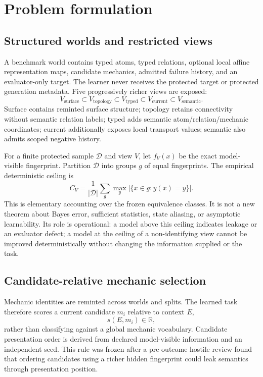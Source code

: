 \section{Problem formulation}

\subsection{Structured worlds and restricted views}

A benchmark world contains typed atoms, typed relations, optional local affine representation maps, candidate mechanics, admitted failure history, and an evaluator-only target. The learner never receives the protected target or protected generation metadata. Five progressively richer views are exposed:
\[
V_{\mathrm{surface}} \subset V_{\mathrm{topology}} \subset V_{\mathrm{typed}}
\subset V_{\mathrm{current}} \subset V_{\mathrm{semantic}}.
\]
Surface contains reminted surface structure; topology retains connectivity without semantic relation labels; typed adds semantic atom/relation/mechanic coordinates; current additionally exposes local transport values; semantic also admits scoped negative history.

For a finite protected sample $\mathcal{D}$ and view $V$, let $f_V(x)$ be the exact model-visible fingerprint. Partition $\mathcal{D}$ into groups $g$ of equal fingerprints. The empirical deterministic ceiling is
\[
C_V = \frac{1}{|\mathcal{D}|}\sum_g \max_y |\{x\in g : y(x)=y\}|.
\]
This is elementary accounting over the frozen equivalence classes. It is not a new theorem about Bayes error, sufficient statistics, state aliasing, or asymptotic learnability. Its role is operational: a model above this ceiling indicates leakage or an evaluator defect; a model at the ceiling of a non-identifying view cannot be improved deterministically without changing the information supplied or the task.

\subsection{Candidate-relative mechanic selection}

Mechanic identities are reminted across worlds and splits. The learned task therefore scores a current candidate $m_i$ relative to context $E$,
\[
s(E,m_i) \in \mathbb{R},
\]
rather than classifying against a global mechanic vocabulary. Candidate presentation order is derived from declared model-visible information and an independent seed. This rule was frozen after a pre-outcome hostile review found that ordering candidates using a richer hidden fingerprint could leak semantics through presentation position.

